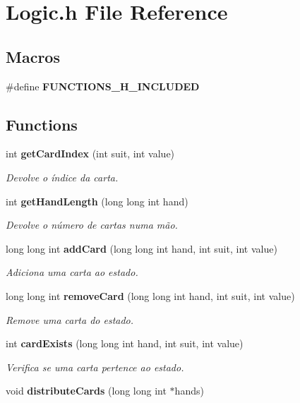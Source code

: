 \section{Logic.\+h File Reference}
\label{_logic_8h}
\subsection*{Macros}
\begin{DoxyCompactItemize}
\item 
\#define {\bf F\+U\+N\+C\+T\+I\+O\+N\+S\+\_\+\+H\+\_\+\+I\+N\+C\+L\+U\+D\+ED}
\end{DoxyCompactItemize}
\subsection*{Functions}
\begin{DoxyCompactItemize}
\item 
int {\bf get\+Card\+Index} (int suit, int value)
\begin{DoxyCompactList}\small\item\em Devolve o índice da carta. \end{DoxyCompactList}\item 
int {\bf get\+Hand\+Length} (long long int hand)
\begin{DoxyCompactList}\small\item\em Devolve o número de cartas numa mão. \end{DoxyCompactList}\item 
long long int {\bf add\+Card} (long long int hand, int suit, int value)
\begin{DoxyCompactList}\small\item\em Adiciona uma carta ao estado. \end{DoxyCompactList}\item 
long long int {\bf remove\+Card} (long long int hand, int suit, int value)
\begin{DoxyCompactList}\small\item\em Remove uma carta do estado. \end{DoxyCompactList}\item 
int {\bf card\+Exists} (long long int hand, int suit, int value)
\begin{DoxyCompactList}\small\item\em Verifica se uma carta pertence ao estado. \end{DoxyCompactList}\item 
void {\bf distribute\+Cards} (long long int $\ast$hands)

\end{DoxyCompactItemize}
